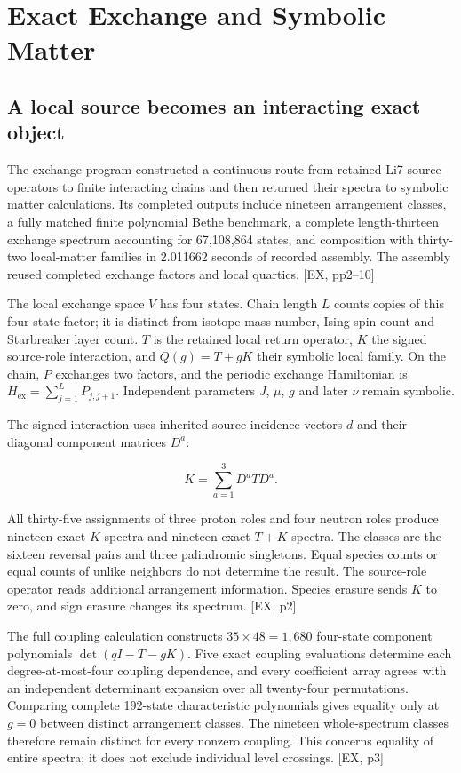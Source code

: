 \chapter{Exact Exchange and Symbolic Matter}\label{exact-exchange-and-symbolic-matter}

\section{A local source becomes an interacting exact object}\label{a-local-source-becomes-an-interacting-exact-object}

The exchange program constructed a continuous route from retained Li7 source operators to finite interacting chains and then returned their spectra to symbolic matter calculations. Its completed outputs include nineteen arrangement classes, a fully matched finite polynomial Bethe benchmark, a complete length-thirteen exchange spectrum accounting for 67,108,864 states, and composition with thirty-two local-matter families in 2.011662 seconds of recorded assembly. The assembly reused completed exchange factors and local quartics. {[}EX, pp2--10{]}

The local exchange space \(V\) has four states. Chain length \(L\) counts copies of this four-state factor; it is distinct from isotope mass number, Ising spin count and Starbreaker layer count. \(T\) is the retained local return operator, \(K\) the signed source-role interaction, and \(Q(g)=T+gK\) their symbolic local family. On the chain, \(P\) exchanges two factors, and the periodic exchange Hamiltonian is \(H_{\mathrm{ex}}=\sum_{j=1}^L P_{j,j+1}\). Independent parameters \(J\), \(\mu\), \(g\) and later \(\nu\) remain symbolic.

The signed interaction uses inherited source incidence vectors \(d\) and their diagonal component matrices \(D^a\):

\[
K=\sum_{a=1}^{3}D^aTD^a.
\]

All thirty-five assignments of three proton roles and four neutron roles produce nineteen exact \(K\) spectra and nineteen exact \(T+K\) spectra. The classes are the sixteen reversal pairs and three palindromic singletons. Equal species counts or equal counts of unlike neighbors do not determine the result. The source-role operator reads additional arrangement information. Species erasure sends \(K\) to zero, and sign erasure changes its spectrum. {[}EX, p2{]}

The full coupling calculation constructs \(35\times48=1{,}680\) four-state component polynomials \(\det(qI-T-gK)\). Five exact coupling evaluations determine each degree-at-most-four coupling dependence, and every coefficient array agrees with an independent determinant expansion over all twenty-four permutations. Comparing complete 192-state characteristic polynomials gives equality only at \(g=0\) between distinct arrangement classes. The nineteen whole-spectrum classes therefore remain distinct for every nonzero coupling. This concerns equality of entire spectra; it does not exclude individual level crossings. {[}EX, p3{]}

